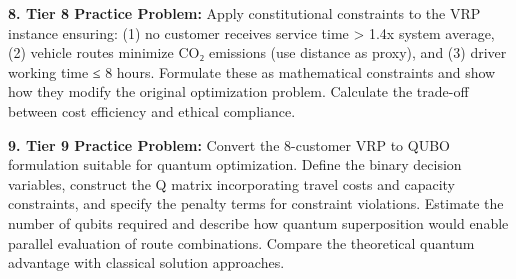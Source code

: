 \documentclass{article}
\begin{document}
\textbf{8. Tier 8 Practice Problem:} Apply constitutional constraints to the VRP instance ensuring: (1) no customer receives service time > 1.4x system average, (2) vehicle routes minimize CO₂ emissions (use distance as proxy), and (3) driver working time ≤ 8 hours. Formulate these as mathematical constraints and show how they modify the original optimization problem. Calculate the trade-off between cost efficiency and ethical compliance.

\textbf{9. Tier 9 Practice Problem:} Convert the 8-customer VRP to QUBO formulation suitable for quantum optimization. Define the binary decision variables, construct the Q matrix incorporating travel costs and capacity constraints, and specify the penalty terms for constraint violations. Estimate the number of qubits required and describe how quantum superposition would enable parallel evaluation of route combinations. Compare the theoretical quantum advantage with classical solution approaches.
\end{document}
